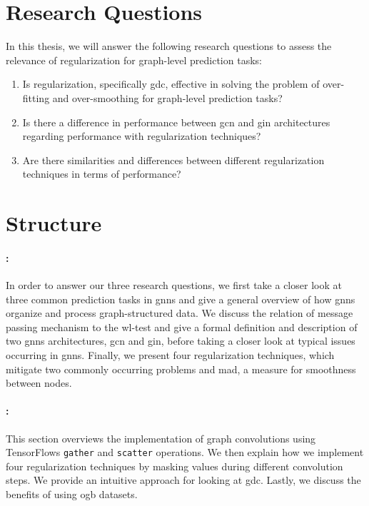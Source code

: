 \section{Research Questions}%
\label{sec:intro:questions}
In this thesis, we will answer the following research questions to assess the relevance of regularization for graph-level prediction tasks:
\begin{enumerate}
    \item Is regularization, specifically \ac{gdc}, effective in solving the problem of over-fitting and over-smoothing for graph-level prediction tasks?
    \item Is there a difference in performance between \ac{gcn} and \ac{gin} architectures regarding performance with regularization techniques?
    \item Are there similarities and differences between different regularization techniques in terms of performance?
\end{enumerate}
\section{Structure}%
\label{sec:intro:structure}

\paragraph{: }
In order to answer our three research questions, we first take a closer look at three common prediction tasks in \acp{gnn}
and give a general overview of how \acp{gnn} organize and process graph-structured data.
We discuss the relation of message passing mechanism to the \ac{wl}-test and give a formal definition and description of two \acp{gnn} architectures, \ac{gcn} and \ac{gin}, before taking a closer look at typical issues occurring in \acp{gnn}.
Finally, we present four regularization techniques, which mitigate two commonly occurring problems and \acf{mad}, a measure for smoothness between nodes\cite{Chen2020}.
\paragraph{: }
This section overviews the implementation of graph convolutions using TensorFlows \texttt{gather} and \texttt{scatter} operations.
We then explain how we implement four regularization techniques by masking values during different convolution steps.
We provide an intuitive approach for looking at \ac{gdc}.
Lastly, we discuss the benefits of using \ac{ogb} datasets.
